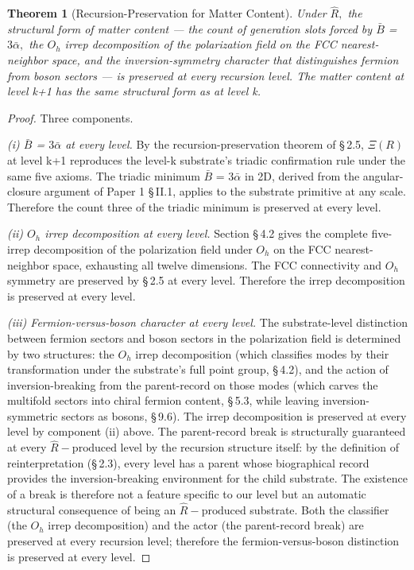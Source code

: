 \documentclass[11pt,oneside]{report}
\newtheorem{theorem}{Theorem}[section]
\theoremstyle{definition}
\theoremstyle{remark}
\begin{document}
\begin{theorem}[Recursion-Preservation for Matter Content]
Under \ensuremath{\hat{R},} the structural form of matter content --- the count of
generation slots forced by \ensuremath{\bar{B}} = \ensuremath{3\bar{\alpha},} the \ensuremath{O_{h}} irrep decomposition of the
polarization field on the FCC nearest-neighbor space, and the
inversion-symmetry character that distinguishes fermion from boson
sectors --- is preserved at every recursion level. The matter content at
level k+1 has the same structural form as at level k.
\end{theorem}

\begin{proof}
Three components.

\emph{(i) \ensuremath{\bar{B}} = \ensuremath{3\bar{\alpha}} at every level.} By the recursion-preservation theorem
of \S\,2.5, \ensuremath{\Xi (R)} at level k+1 reproduces the level-k substrate's triadic
confirmation rule under the same five axioms. The triadic minimum \ensuremath{\bar{B}} = \ensuremath{3\bar{\alpha}}
in 2D, derived from the angular-closure argument of Paper 1 \S\,II.1,
applies to the substrate primitive at any scale. Therefore the count
three of the triadic minimum is preserved at every level.

\emph{(ii) \ensuremath{O_{h}} irrep decomposition at every level.} Section \S\,4.2 gives
the complete five-irrep decomposition of the polarization field under
\ensuremath{O_{h}} on the FCC nearest-neighbor space, exhausting all twelve
dimensions. The FCC connectivity and \ensuremath{O_{h}} symmetry are preserved by \S\,2.5
at every level. Therefore the irrep decomposition is preserved at every
level.

\emph{(iii) Fermion-versus-boson character at every level.} The
substrate-level distinction between fermion sectors and boson sectors in
the polarization field is determined by two structures: the \ensuremath{O_{h}} irrep
decomposition (which classifies modes by their transformation under the
substrate's full point group, \S\,4.2), and the action of
inversion-breaking from the parent-record on those modes (which carves
the multifold sectors into chiral fermion content, \S\,5.3, while leaving
inversion-symmetric sectors as bosons, \S\,9.6). The irrep decomposition is
preserved at every level by component (ii) above. The parent-record
break is structurally guaranteed at every \ensuremath{\hat{R}-\text{produced}} level by the
recursion structure itself: by the definition of reinterpretation
(\S\,2.3), every level has a parent whose biographical record provides the
inversion-breaking environment for the child substrate. The existence of
a break is therefore not a feature specific to our level but an
automatic structural consequence of being an \ensuremath{\hat{R}-\text{produced}} substrate. Both
the classifier (the \ensuremath{O_{h}} irrep decomposition) and the actor (the
parent-record break) are preserved at every recursion level; therefore
the fermion-versus-boson distinction is preserved at every level.


\end{proof}
\end{document}
